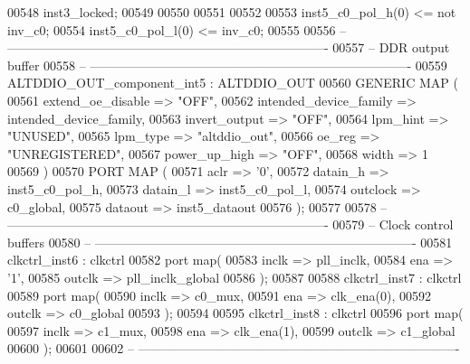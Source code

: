 \begin{DoxyCode}
00548                inst3\_locked;
00549 
00550 
00551 
00552 
00553 inst5\_c0\_pol\_h(\textcolor{vhdllogic}{0}) <= \textcolor{keywordflow}{not} inv\_c0;
00554 inst5\_c0\_pol\_l(\textcolor{vhdllogic}{0}) <= inv\_c0;
00555 
00556 \textcolor{keyword}{-- ----------------------------------------------------------------------------}
00557 \textcolor{keyword}{-- DDR output buffer }
00558 \textcolor{keyword}{-- ----------------------------------------------------------------------------}
00559 ALTDDIO\_OUT\_component\_int5 : ALTDDIO\_OUT
00560 \textcolor{keywordflow}{GENERIC} \textcolor{keywordflow}{MAP} (
00561    extend\_oe\_disable       => \textcolor{keyword}{"OFF"},
00562    intended\_device\_family  => intended_device_family,
00563    invert\_output           => \textcolor{keyword}{"OFF"},
00564    lpm\_hint                => \textcolor{keyword}{"UNUSED"},
00565    lpm\_type                => \textcolor{keyword}{"altddio\_out"},
00566    oe\_reg                  => \textcolor{keyword}{"UNREGISTERED"},
00567    power\_up\_high           => \textcolor{keyword}{"OFF"},
00568    width                   => \textcolor{vhdllogic}{1}
00569 \textcolor{vhdlchar}{)}
00570 \textcolor{keywordflow}{PORT} \textcolor{keywordflow}{MAP} (
00571    aclr           => '0',
00572    datain\_h       => inst5_c0_pol_h,
00573    datain\_l       => inst5_c0_pol_l,
00574    outclock       => c0_global,
00575    dataout        => inst5_dataout
00576 \textcolor{vhdlchar}{)};
00577 
00578 \textcolor{keyword}{-- ----------------------------------------------------------------------------}
00579 \textcolor{keyword}{-- Clock control buffers }
00580 \textcolor{keyword}{-- ----------------------------------------------------------------------------}
00581 clkctrl_inst6 : clkctrl 
00582 \textcolor{keywordflow}{port} \textcolor{keywordflow}{map}(
00583    inclk    => pll_inclk,
00584    ena      => '1',
00585    outclk   => pll_inclk_global
00586 \textcolor{vhdlchar}{)};
00587 
00588 clkctrl_inst7 : clkctrl 
00589 \textcolor{keywordflow}{port} \textcolor{keywordflow}{map}(
00590    inclk    => c0_mux,
00591    ena      => clk_ena\textcolor{vhdlchar}{(}\textcolor{vhdllogic}{0}\textcolor{vhdlchar}{)},
00592    outclk   => c0_global
00593 \textcolor{vhdlchar}{)};
00594 
00595 clkctrl_inst8 : clkctrl 
00596 \textcolor{keywordflow}{port} \textcolor{keywordflow}{map}(
00597    inclk    => c1_mux,
00598    ena      => clk_ena\textcolor{vhdlchar}{(}\textcolor{vhdllogic}{1}\textcolor{vhdlchar}{)},
00599    outclk   => c1_global
00600 \textcolor{vhdlchar}{)};
00601 
00602 \textcolor{keyword}{-- ----------------------------------------------------------------------------}

\end{DoxyCode}
